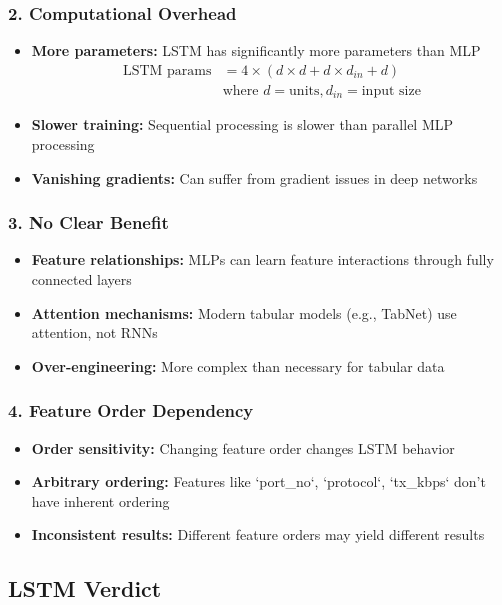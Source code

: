 \documentclass[12pt]{article}
\begin{document}
\subsubsection{2. Computational Overhead}
\begin{itemize}
    \item \textbf{More parameters:} LSTM has significantly more parameters than MLP
    \begin{align*}
    \text{LSTM params} &= 4 \times (d \times d + d \times d_{in} + d) \\
    &\text{where } d = \text{units}, d_{in} = \text{input size}
    \end{align*}
    \item \textbf{Slower training:} Sequential processing is slower than parallel MLP processing
    \item \textbf{Vanishing gradients:} Can suffer from gradient issues in deep networks
\end{itemize}

\subsubsection{3. No Clear Benefit}
\begin{itemize}
    \item \textbf{Feature relationships:} MLPs can learn feature interactions through fully connected layers
    \item \textbf{Attention mechanisms:} Modern tabular models (e.g., TabNet) use attention, not RNNs
    \item \textbf{Over-engineering:} More complex than necessary for tabular data
\end{itemize}

\subsubsection{4. Feature Order Dependency}
\begin{itemize}
    \item \textbf{Order sensitivity:} Changing feature order changes LSTM behavior
    \item \textbf{Arbitrary ordering:} Features like `port_no`, `protocol`, `tx_kbps` don't have inherent ordering
    \item \textbf{Inconsistent results:} Different feature orders may yield different results
\end{itemize}

\subsection{LSTM Verdict}
\end{document}
